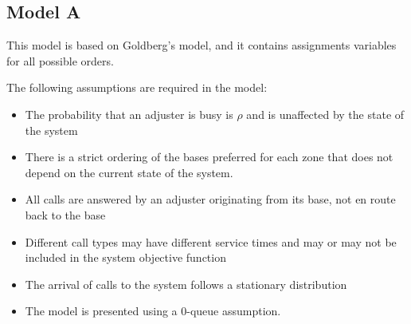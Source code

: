 
\subsection{Model A}

\begin{frame}
  This model is based on Goldberg's model, and it contains assignments
  variables for all possible orders.

  The following assumptions are required in the model:
  \begin{itemize}
  \item The probability that an adjuster is busy is $\rho$
    and is unaffected by the state of the system
  \item There is a strict ordering of the bases preferred for each zone
    that does not depend on the current state of the system. 
  \item All calls are answered by an adjuster originating from its base,
    not en route back to the base
  \item Different call types may have different service times
    and may or may not be included in the system objective function
  \item The arrival of calls to the system follows a stationary distribution
  \item The model is presented using a 0-queue assumption.
  \end{itemize}
  
\end{frame}


